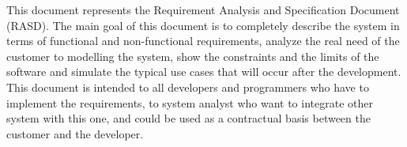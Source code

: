 This document represents the Requirement Analysis and Specification Document (RASD). The main goal of this document is to completely describe the system in terms of functional and non-functional requirements, analyze the real need of the customer to modelling the system, show the constraints and the limits of the software and simulate the typical use cases that will occur after the development. This document is intended to all developers and programmers who have to implement the requirements, to system analyst who want to integrate other system with this one, and could be used as a contractual basis between the customer and the developer.